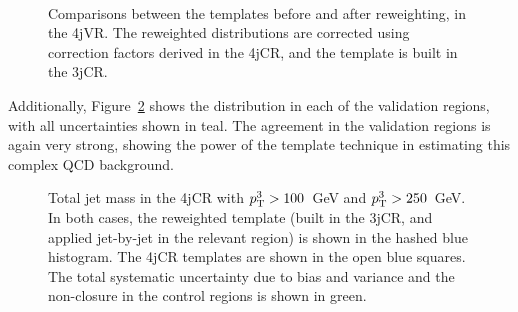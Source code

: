 \begin{figure}[!ht]
  \centering
  
  \\
    
  \caption{Comparisons between the templates before and after reweighting, in the 4jVR. The reweighted distributions are corrected using correction factors derived in the 4jCR, and the template is built in the 3jCR.}
               
  \label{fig:search:search:4jvr:reweight}
\end{figure}
%

Additionally, Figure~\ref{fig:search:search:4jvr:Total} shows the \MJ distribution in each of the validation regions, with all uncertainties shown in teal. The agreement in the validation regions is again very strong, showing the power of the template technique in estimating this complex QCD background.

\begin{figure}[!ht]
  \centering
  \caption{Total jet mass in the 4jCR with $p_{\text{T}}^{3}>100$~GeV and $p_{\text{T}}^{3} > 250$~GeV. In both cases, the reweighted template (built in the 3jCR, and applied jet-by-jet in the relevant region) is shown in the hashed blue histogram. The 4jCR templates are shown in the open blue squares. The total systematic uncertainty due to bias and variance and the non-closure in the control regions is shown in green.}
  \label{fig:search:search:4jvr:Total}
\end{figure}
%


